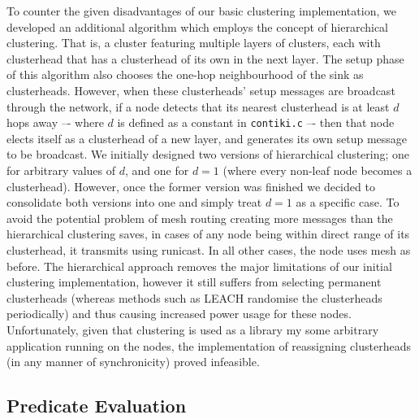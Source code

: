 To counter the given disadvantages of our basic clustering implementation, we developed an additional algorithm which employs the concept of hierarchical clustering. That is, a cluster featuring multiple layers of clusters, each with  clusterhead that has a clusterhead of its own in the next layer. The setup phase of this algorithm also chooses the one-hop neighbourhood of the sink as clusterheads. However, when these clusterheads' setup messages are broadcast through the network, if a node detects that its nearest clusterhead is at least $d$ hops away –- where $d$ is defined as a constant in \verb|contiki.c| –- then that node elects itself as a clusterhead of a new layer, and generates its own setup message to be broadcast. We initially designed two versions of hierarchical clustering; one for arbitrary values of $d$, and one for $d=1$ (where every non-leaf node becomes a clusterhead). However, once the former version was finished we decided to consolidate both versions into one and simply treat $d=1$ as a specific case. To avoid the potential problem of mesh routing creating more messages than the hierarchical clustering saves, in cases of any node being within direct range of its clusterhead, it transmits using runicast. In all other cases, the node uses mesh as before. The hierarchical approach removes the major limitations of our initial clustering implementation, however it still suffers from selecting permanent clusterheads (whereas methods such as LEACH randomise the clusterheads periodically) and thus causing increased power usage for these nodes. Unfortunately, given that clustering is used as a library my some arbitrary application running on the nodes, the implementation of reassigning clusterheads (in any manner of synchronicity) proved infeasible.


\subsection{Predicate Evaluation}

